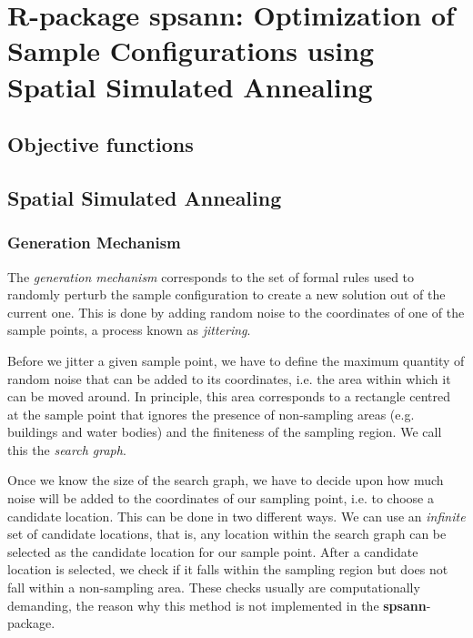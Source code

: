 \artigofalse
\chapter{R-package spsann: Optimization of Sample Configurations using Spatial 
Simulated Annealing}
\label{apen:spsann}

% 

\section{Objective functions}



\section{Spatial Simulated Annealing}

\subsection{Generation Mechanism}

The \textit{generation mechanism} corresponds to the set of formal rules used 
to randomly perturb the sample conﬁguration to create a new solution out of the
current one. This is done by adding random noise to the coordinates of one of 
the sample points, a process known as \textit{jittering}.

Before we jitter a given sample point, we have to define the maximum quantity 
of random noise that can be added to its coordinates, i.e. the area within 
which it can be moved around. In principle, this area corresponds to a rectangle
centred at the sample point that ignores the presence of non-sampling areas 
(e.g. buildings and water bodies) and the finiteness of the sampling region. We 
call this the \textit{search graph}.

Once we know the size of the search graph, we have to decide upon how much 
noise will be added to the coordinates of our sampling point, i.e. to choose a
candidate location. This can be done in two different ways. We can use an 
\textit{infinite} set of candidate locations, that is, any location within the 
search graph can be selected as the candidate location for our sample point. 
After a candidate location is selected, we check if it falls within the sampling
region but does not fall within a non-sampling area. These checks usually are 
computationally demanding, the reason why this method is not implemented in 
the \textbf{spsann}-package.

